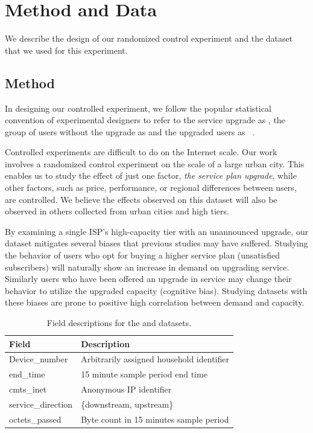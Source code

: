 \section{Method and Data}\label{sec:data}

We describe the design of our randomized control experiment and the
dataset that we used for this experiment.

\subsection{Method}

In designing our controlled experiment, we follow the popular
statistical convention of experimental designers to refer to the service
upgrade as \factor{}, the group of users without the upgrade as
\control{} and the upgraded users as \treatment{}~\cite{stats-design}.

Controlled experiments are difficult to do on the Internet scale.  Our
work involves a randomized control experiment on the scale of a large
urban city. This enables us to study the effect of just one factor,
\emph{the service plan upgrade}, while other factors, such as price,
performance, or regional differences between users, are controlled. We
believe the effects observed on this dataset will also be observed in
others collected from urban cities and high tiers.

By examining a single ISP's high-capacity tier with an unannounced upgrade,
our dataset mitigates several biases that previous studies may have 
suffered. Studying the behavior of users who opt for buying a higher service plan
(unsatisfied subscribers) will naturally show an increase in demand on
upgrading service\cite{dasu-imc2014}.
Similarly users who have been offered an
upgrade in service may change their behavior to utilize the upgraded capacity
(cognitive bias)\cite{zheleva2013}. Studying datasets with these biases are prone 
to positive high correlation between demand and capacity. 

\begin{table}[t]
\centering
\small
\begin{tabular}{ l l }
\hline
\textbf{Field}         & \textbf{Description}				\\\hline
Device\_number         & Arbitrarily assigned household identifier	\\
end\_time              & 15 minute sample period end time		\\
cmts\_inet             & Anonymous IP identifier			\\
service\_direction     & \{downstream, upstream\}                 	\\
octets\_passed         & Byte count in 15 minutes sample period		\\\hline
\end{tabular}
\caption{Field descriptions for the \control{} and \treatment{} datasets.}
\label{tab:field-description}
\end{table}

